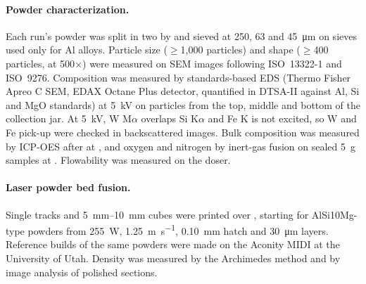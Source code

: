 \documentclass[11pt]{article}
\begin{document}
\paragraph{Powder characterization.}
Each run's powder was split in two by  and
sieved at 250, 63 and \SI{45}{\micro\metre} on sieves used only for Al alloys.
Particle size ($\ge$1,000 particles) and shape ($\ge$400 particles, at
500$\times$) were measured on SEM images following ISO~13322-1 and ISO~9276.
Composition was measured by standards-based EDS (Thermo Fisher Apreo C SEM,
EDAX Octane Plus detector, quantified in DTSA-II against Al, Si and MgO
standards) at \SI{5}{\kilo\volt} on particles from the top, middle and bottom of
the collection jar. At \SI{5}{\kilo\volt}, W M$\alpha$ overlaps Si K$\alpha$ and
Fe K is not excited, so W and Fe pick-up were checked in backscattered images.
Bulk composition was measured by ICP-OES after  at , and oxygen and
nitrogen by inert-gas fusion on sealed \SI{5}{\gram} samples at . Flowability was
measured on the doser.\cite{spierings2016flow,slotwinski2014}

\paragraph{Laser powder bed fusion.}
 Single tracks and
\SIrange{5}{10}{\milli\metre} cubes were printed over , starting for AlSi10Mg-type powders from \SI{255}{\watt},
\SI{1.25}{\metre\per\second}, \SI{0.10}{\milli\metre} hatch and
\SI{30}{\micro\metre} layers.\cite{king2014,tang2017} Reference builds of the
same powders were made on the Aconity MIDI at the University of Utah.
Density was measured by the Archimedes method and by image analysis of polished
sections.\cite{spierings2011} 
\end{document}
